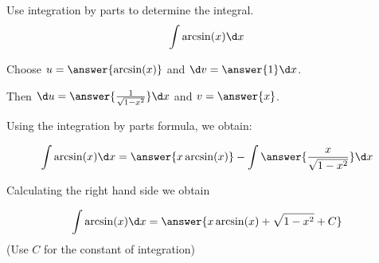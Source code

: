 \documentclass{ximera}
\author{Jason Miller}
\begin{document}
\begin{exercise}
Use integration by parts to determine the integral.
\[
\int \arcsin(x) \d x 
\]


Choose $u=\answer{ \arcsin(x) }$ and $\d v=\answer{1 }\d x$. 

Then $\d u= \answer{ \frac{1}{\sqrt{1-x^{2}}} } \d x$ and $v= \answer{x}$.

Using the integration by parts formula, we obtain:

\[
\int \arcsin(x) \d x= \answer{x\arcsin(x)} - \int \answer{ \frac{x}{\sqrt{1-x^{2}}} } \d x
\]

Calculating the right hand side we obtain

\[
\int \arcsin(x) \d x= \answer{x\arcsin(x)+\sqrt{1-x^2}+C}
\]
(Use $C$ for the constant of integration)

\end{exercise}
\end{document}
